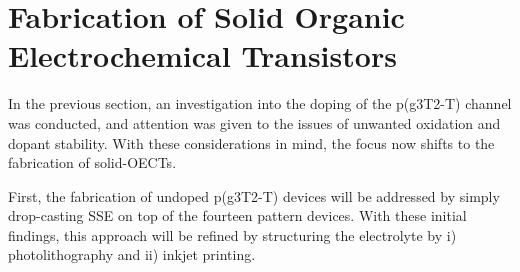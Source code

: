





\section{Fabrication of Solid Organic Electrochemical Transistors}

In the previous section, an investigation into the doping of the p(g3T2-T) channel was conducted, and attention was given to the issues of unwanted oxidation and dopant stability. With these considerations in mind, the focus now shifts to the fabrication of solid-OECTs. 

First, the fabrication of undoped p(g3T2-T) devices will be addressed by simply drop-casting SSE on top of the fourteen pattern devices. With these initial findings, this approach will be refined by structuring the electrolyte by i) photolithography \cite{weissbachPhotopatternableSolidElectrolyte2022} and ii) inkjet printing. 

